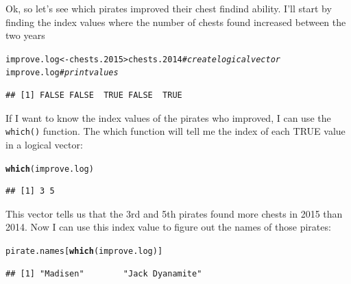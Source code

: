 \documentclass{tufte-book}\usepackage[]{graphicx}\usepackage[]{color}
\makeatletter
\newcommand{\hlcom}[1]{\textcolor[rgb]{0.678,0.584,0.686}{\textit{#1}}}%
\newcommand{\hlopt}[1]{\textcolor[rgb]{0,0,0}{#1}}%
\newcommand{\hlstd}[1]{\textcolor[rgb]{0.345,0.345,0.345}{#1}}%
\newcommand{\hlkwb}[1]{\textcolor[rgb]{0.69,0.353,0.396}{#1}}%
\newcommand{\hlkwd}[1]{\textcolor[rgb]{0.737,0.353,0.396}{\textbf{#1}}}%
\newenvironment{kframe}{%
 \def\at@end@of@kframe{}%
 \ifinner\ifhmode%
  \def\at@end@of@kframe{\end{minipage}}%
  \begin{minipage}{\columnwidth}%
 \fi\fi%
 \def\FrameCommand##1{\hskip\@totalleftmargin \hskip-\fboxsep
 \colorbox{shadecolor}{##1}\hskip-\fboxsep
     \hskip-\linewidth \hskip-\@totalleftmargin \hskip\columnwidth}%
 \MakeFramed {\advance\hsize-\width
   \@totalleftmargin\z@ \linewidth\hsize
   \@setminipage}}%
 {\par\unskip\endMakeFramed%
 \at@end@of@kframe}
\newenvironment{knitrout}{}{} %
\makeatother
\begin{document}
\begin{footnotesize}
Ok, so let's see which pirates improved their chest findind ability. I'll start by finding the index values where the number of chests found increased between the two years

\begin{footnotesize}
\begin{knitrout}
\color{fgcolor}\begin{kframe}
\begin{alltt}
\hlstd{improve.log} \hlkwb{<-} \hlstd{chests.2015} \hlopt{>} \hlstd{chests.2014} \hlcom{# create logical vector}
\hlstd{improve.log} \hlcom{# print values}
\end{alltt}
\begin{verbatim}
## [1] FALSE FALSE  TRUE FALSE  TRUE
\end{verbatim}
\end{kframe}
\end{knitrout}
\end{footnotesize}

If I want to know the index values of the pirates who improved, I can use the \texttt{which()} function. The which function will tell me the index of each TRUE value in a logical vector:

\begin{footnotesize}
\begin{knitrout}
\color{fgcolor}\begin{kframe}
\begin{alltt}
\hlkwd{which}\hlstd{(improve.log)}
\end{alltt}
\begin{verbatim}
## [1] 3 5
\end{verbatim}
\end{kframe}
\end{knitrout}
\end{footnotesize}

This vector tells us that the 3rd and 5th pirates found more chests in 2015 than 2014. Now I can use this index value to figure out the names of those pirates:

\begin{footnotesize}
\begin{knitrout}
\color{fgcolor}\begin{kframe}
\begin{alltt}
\hlstd{pirate.names[}\hlkwd{which}\hlstd{(improve.log)]}
\end{alltt}
\begin{verbatim}
## [1] "Madisen"        "Jack Dyanamite"
\end{verbatim}
\end{kframe}
\end{knitrout}
\end{footnotesize}



\end{footnotesize}
\end{document}
